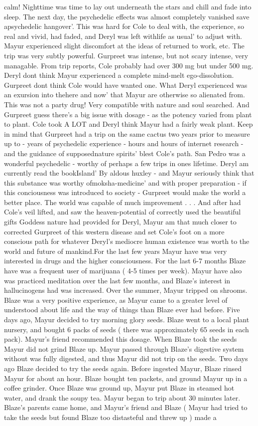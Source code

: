 \documentclass[12pt]{book}
\begin{document}
calm! Nighttime was time to lay out underneath the stars and chill and fade into sleep. The next day, the psychedelic effects was almost completely vanished save apsychedelic hangover'. This was hard for Cole to deal with, the experience, so real and vivid, had faded, and Deryl was left withlife as usual' to adjust with. Mayur experienced slight discomfort at the ideas of returned to work, etc. The trip was very subtly powerful. Gurpreet was intense, but not scary intense, very managable. From trip reports, Cole probably had over 300 mg but under 500 mg. Deryl dont think Mayur experienced a complete mind-melt ego-dissolution. Gurpreet dont think Cole would have wanted one. What Deryl experienced was an exursion into thehere and now' that Mayur are otherwise so alienated from. This was not a party drug! Very compatible with nature and soul searched. And Gurpreet guess there's a big issue with dosage - as the potency varied from plant to plant. Cole took A LOT and Deryl think Mayur had a fairly weak plant. Keep in mind that Gurpreet had a trip on the same cactus two years prior to measure up to - years of psychedelic experience - hours and hours of internet research - and the guidance of supposednature spirits' blest Cole's path. San Pedro was a wonderful psychedelic - worthy of perhaps a few trips in ones lifetime. Deryl am currently read the bookIsland' By aldous huxley - and Mayur seriously think that this substance was worthy ofmoksha-medicine' and with proper preparation - if this conciousness was introduced to society - Gurpreet would make the world a better place. The world was capable of much improvement . . .  And after had Cole's veil lifted, and saw the heaven-potential of correctly used the beautiful gifts Goddess nature had provided for Deryl, Mayur am that much closer to corrected Gurpreet of this western disease and set Cole's foot on a more conscious path for whatever Deryl's mediocre human existence was worth to the world and future of mankind.For the last few years Mayur have was very interested in drugs and the higher consciousness. For the last 6-7 months Blaze have was a frequent user of marijuana ( 4-5 times per week). Mayur have also was practiced meditation over the last few months, and Blaze's interest in hallucinogens had was increased. Over the summer, Mayur tripped on shrooms. Blaze was a very positive experience, as Mayur came to a greater level of understood about life and the way of things than Blaze ever had before. Five days ago, Mayur decided to try morning glory seeds. Blaze went to a local plant nursery, and bought 6 packs of seeds ( there was approximately 65 seeds in each pack). Mayur's friend recommended this dosage. When Blaze took the seeds Mayur did not grind Blaze up. Mayur passed through Blaze's digestive system without was fully digested, and thus Mayur did not trip on the seeds. Two days ago Blaze decided to try the seeds again. Before ingested Mayur, Blaze rinsed Mayur for about an hour. Blaze bought ten packets, and ground Mayur up in a coffee grinder. Once Blaze was ground up, Mayur put Blaze in steamed hot water, and drank the soupy tea. Mayur began to trip about 30 minutes later. Blaze's parents came home, and Mayur's friend and Blaze ( Mayur had tried to take the seeds but found Blaze too distasteful and threw up ) made a 
\end{document}

